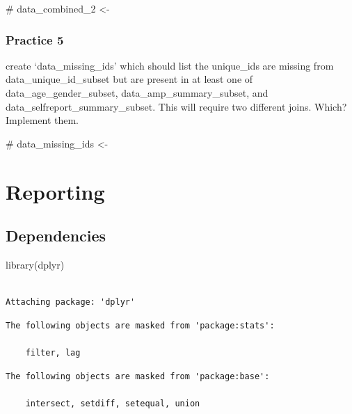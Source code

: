\documentclass[
  letterpaper,
  DIV=11,
  numbers=noendperiod]{scrreprt}
\newenvironment{Shaded}{\begin{snugshade}}{\end{snugshade}}
\newcommand{\CommentTok}[1]{\textcolor[rgb]{0.37,0.37,0.37}{#1}}
\newcommand{\FunctionTok}[1]{\textcolor[rgb]{0.28,0.35,0.67}{#1}}
\newcommand{\NormalTok}[1]{\textcolor[rgb]{0.00,0.23,0.31}{#1}}
\begin{document}
\begin{Shaded}
\begin{Highlighting}[]
\CommentTok{\# data\_combined\_2 \textless{}{-} }
\end{Highlighting}
\end{Shaded}

\subsection{Practice 5}\label{practice-5}

create `data\_missing\_ids' which should list the unique\_ids are
missing from data\_unique\_id\_subset but are present in at least one of
data\_age\_gender\_subset, data\_amp\_summary\_subset, and
data\_selfreport\_summary\_subset. This will require two different
joins. Which? Implement them.

\begin{Shaded}
\begin{Highlighting}[]
\CommentTok{\# data\_missing\_ids \textless{}{-} }
\end{Highlighting}
\end{Shaded}


\chapter{Reporting}\label{reporting}

\section{Dependencies}\label{dependencies-4}

\begin{Shaded}
\begin{Highlighting}[]
\FunctionTok{library}\NormalTok{(dplyr)}
\end{Highlighting}
\end{Shaded}

\begin{verbatim}

Attaching package: 'dplyr'
\end{verbatim}

\begin{verbatim}
The following objects are masked from 'package:stats':

    filter, lag
\end{verbatim}

\begin{verbatim}
The following objects are masked from 'package:base':

    intersect, setdiff, setequal, union
\end{verbatim}
\end{document}
